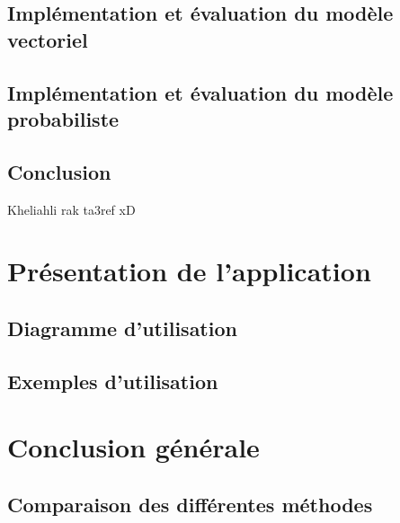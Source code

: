\documentclass[12pt]{report}
\begin{document}
	\section{Implémentation et évaluation du modèle vectoriel}
	
	\section{Implémentation et évaluation du modèle probabiliste}
	
	
	\section{Conclusion}
	Kheliahli rak ta3ref xD 
	
	
\chapter{Présentation de l'application}

	\section{Diagramme d'utilisation}
	\section{Exemples d'utilisation}
	
\chapter{Conclusion générale}
	\section{Comparaison des différentes méthodes}
	
\end{document}
